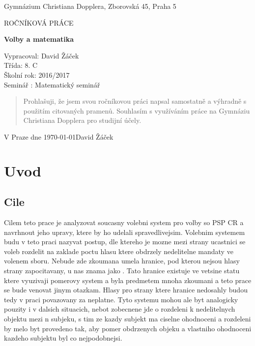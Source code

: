 \documentclass[12pt,a4paper]{report}
\begin{document}
\begin{titlepage}
	\begin{center}
	{\large Gymnázium Christiana Dopplera, Zborovská 45, Praha 5 \par}
	\vfill
	\par\vspace{1cm}
	{\scshape\LARGE ROČNÍKOVÁ PRÁCE \par}
	{\huge\bfseries Volby a matematika\par}
	\vfill
\end{center}
Vypracoval: David Žáček \\
Třída: 8. C \\
Školní rok: 2016/2017 \\
Seminář : Matematický seminář \\
	\vfill
\end{titlepage}

\vspace*{\fill}
\begin{quote}
Prohlašuji, že jsem svou ročníkovou práci napsal samostatně a výhradně s
použitím 
citovaných pramenů. Souhlasím s
využíváním 
práce na Gymnáziu Christiana Dopplera 
pro studijní účely. \\
\end{quote}

V Praze dne \today \hfill David Žáček

\vspace*{\fill}
\thispagestyle{empty}
\newpage
\tableofcontents
\newpage
\chapter{Uvod}
\section{Cile}
Cilem teto prace je analyzovat soucasny volebni system  pro volby so PSP CR a navrhnout jeho upravy, ktere by ho udelali spravedlivejsim. 
Volebnim systemem budu v teto praci nazyvat postup, dle ktereho je mozne mezi strany ucastnici se voleb rozdelit na zaklade poctu hlasu ktere obdrzely nedelitelne mandaty ve volenem sboru. 
Nebude zde zkoumana umela hranice, pod kterou nejsou hlasy strany zapocitavany, u nas znama jako .
Tato hranice existuje ve vetsine statu ktere vyuzivaji pomerovy system a byla predmetem mnoha zkoumani a teto prace se bude venovat jinym otazkam.
Hlasy pro strany ktere hranice nedosahly budou tedy v praci povazovany za neplatne.
Tyto systemu mohou ale byt analogicky pouzity i v dalsich situacich, nebot zobecnene jde o rozdeleni k nedelitelnych objektu mezi n subjeku, s tim ze kazdy subjekt ma ciselne ohodnoceni a rozdeleni by melo byt provedeno tak, aby pomer obdrzenych objeku a vlastniho ohodnoceni kazdeho subjektu byl co nejpodobnejsi. 
\end{document}
